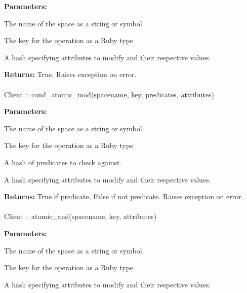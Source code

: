 \noindent\textbf{Parameters:}
\begin{description}[labelindent=\widthof{{\code{attributes}}},leftmargin=*,noitemsep,nolistsep,align=right]
\item[\code{spacename}] The name of the space as a string or symbol.
\item[\code{key}] The key for the operation as a Ruby type
\item[\code{attributes}] A hash specifying attributes to modify and their respective values.
\end{description}

\noindent\textbf{Returns:}
True.  Raises exception on error.

\paragraph{}
\begin{ccode}
Client :: cond_atomic_mod(spacename, key, predicates, attributes)
\end{ccode}
\funcdesc 

\noindent\textbf{Parameters:}
\begin{description}[labelindent=\widthof{{\code{predicates}}},leftmargin=*,noitemsep,nolistsep,align=right]
\item[\code{spacename}] The name of the space as a string or symbol.
\item[\code{key}] The key for the operation as a Ruby type
\item[\code{predicates}] A hash of predicates to check against.
\item[\code{attributes}] A hash specifying attributes to modify and their respective values.
\end{description}

\noindent\textbf{Returns:}
True if predicate, False if not predicate.  Raises exception on error.

\paragraph{}
\begin{ccode}
Client :: atomic_and(spacename, key, attributes)
\end{ccode}
\funcdesc 

\noindent\textbf{Parameters:}
\begin{description}[labelindent=\widthof{{\code{attributes}}},leftmargin=*,noitemsep,nolistsep,align=right]
\item[\code{spacename}] The name of the space as a string or symbol.
\item[\code{key}] The key for the operation as a Ruby type
\item[\code{attributes}] A hash specifying attributes to modify and their respective values.
\end{description}

